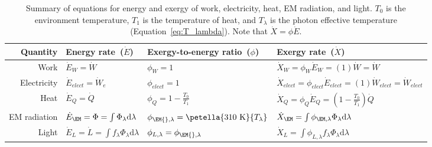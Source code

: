 

\begin{table}
\centering %
\caption{Summary of equations for energy and exergy of work, electricity, heat, EM radiation, and light.
         $T_0$ is the environment temperature, $T_1$ is the temperature of heat, 
         and $T_\lambda$ is the photon effective temperature
         (Equation~\ref{eq:T_lambda}).
         Note that $\dot{X} = \phi \dot{E}$.}
\begin{tabular}{r l l l}
  \toprule
  Quantity & Energy rate~($\dot{E}$) & Exergy-to-energy ratio~($\phi$) & Exergy rate~($\dot{X}$) \\
  \midrule
  Work        
      & $\dot{E}_W = \dot{W}$
      & $\phi_W = 1$
      & $\dot{X}_W = \phi_W \dot{E}_W = (1) \dot{W} = \dot{W}$ \\
  Electricity 
      & $\dot{E}_{elect} = \dot{W}_e$
      & $\phi_{elect} = 1$
      & $\dot{X}_{elect} = \phi_{elect} \dot{E}_{elect} = (1) \dot{W}_{elect} = \dot{W}_{elect}$ \\
  Heat 
      & $\dot{E}_Q = \dot{Q}$   
      & $\phi_Q = 1 - \frac{T_0}{T_1}$  
      & $ \dot{X}_Q = \phi_Q \dot{E}_Q = \left( 1 - \frac{T_0}{T_1} \right) \dot{Q}  $ \\
  EM radiation
      & $\dot{E}_{\EM} = \Phi = \int \Phi_\lambda \mathrm{d}\lambda$ 
      & $\phi_{\EM{},\lambda} = \petella{310 \text{ K}}{T_\lambda}$ 
      & $\dot{X}_{\EM} = \int \phi_{\EM,\lambda} \Phi_\lambda \mathrm{d}\lambda$ \\
  Light
      & $\dot{E}_L = \dot{L} = \int f_\lambda \Phi_\lambda \mathrm{d}\lambda$
      & $\phi_{L,\lambda} = \phi_{\EM{},\lambda}$ 
      & $\dot{X}_L = \int \phi_{L,\lambda} f_\lambda \Phi_\lambda \mathrm{d}\lambda$ \\
  \bottomrule
\end{tabular}
\label{tab:EX_summary}
\end{table}


